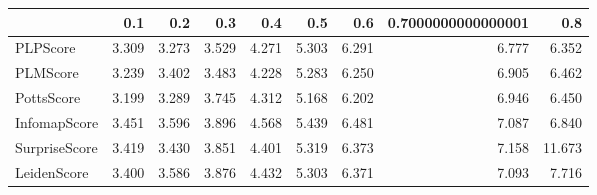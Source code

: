 \begin{tabular}{lrrrrrrrr}
\toprule
{} &   0.1 &   0.2 &   0.3 &   0.4 &   0.5 &   0.6 & 0.7000000000000001 &    0.8 \\
\midrule
PLPScore      & 3.309 & 3.273 & 3.529 & 4.271 & 5.303 & 6.291 &              6.777 &  6.352 \\
PLMScore      & 3.239 & 3.402 & 3.483 & 4.228 & 5.283 & 6.250 &              6.905 &  6.462 \\
PottsScore    & 3.199 & 3.289 & 3.745 & 4.312 & 5.168 & 6.202 &              6.946 &  6.450 \\
InfomapScore  & 3.451 & 3.596 & 3.896 & 4.568 & 5.439 & 6.481 &              7.087 &  6.840 \\
SurpriseScore & 3.419 & 3.430 & 3.851 & 4.401 & 5.319 & 6.373 &              7.158 & 11.673 \\
LeidenScore   & 3.400 & 3.586 & 3.876 & 4.432 & 5.303 & 6.371 &              7.093 &  7.716 \\
\bottomrule
\end{tabular}
